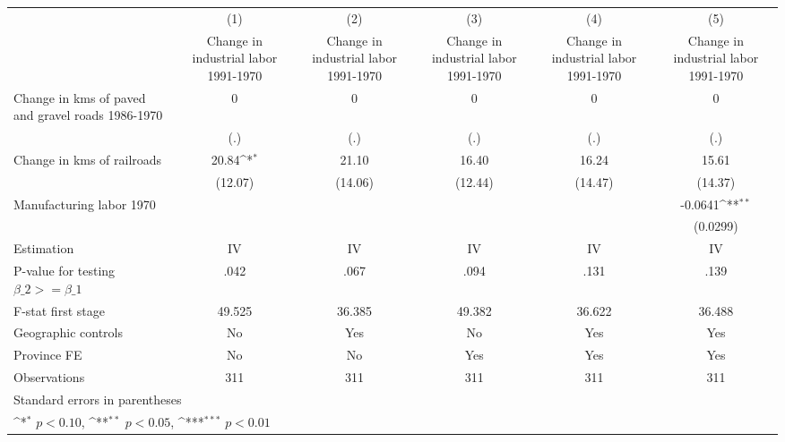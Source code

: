 {
\def\sym#1{\ifmmode^{#1}\else\(^{#1}\)\fi}
\begin{tabular}{l*{5}{c}}
\hline\hline
                    &\multicolumn{1}{c}{(1)}&\multicolumn{1}{c}{(2)}&\multicolumn{1}{c}{(3)}&\multicolumn{1}{c}{(4)}&\multicolumn{1}{c}{(5)}\\
                    &\multicolumn{1}{c}{Change in industrial labor 1991-1970}&\multicolumn{1}{c}{Change in industrial labor 1991-1970}&\multicolumn{1}{c}{Change in industrial labor 1991-1970}&\multicolumn{1}{c}{Change in industrial labor 1991-1970}&\multicolumn{1}{c}{Change in industrial labor 1991-1970}\\
\hline
Change in kms of paved and gravel roads 1986-1970&           0         &           0         &           0         &           0         &           0         \\
                    &         (.)         &         (.)         &         (.)         &         (.)         &         (.)         \\
[1em]
Change in kms of railroads&       20.84\sym{*}  &       21.10         &       16.40         &       16.24         &       15.61         \\
                    &     (12.07)         &     (14.06)         &     (12.44)         &     (14.47)         &     (14.37)         \\
[1em]
Manufacturing labor 1970&                     &                     &                     &                     &     -0.0641\sym{**} \\
                    &                     &                     &                     &                     &    (0.0299)         \\
\hline
Estimation          &          IV         &          IV         &          IV         &          IV         &          IV         \\
P-value for testing $\beta\_2 >= \beta\_1$&        .042         &        .067         &        .094         &        .131         &        .139         \\
F-stat first stage  &      49.525         &      36.385         &      49.382         &      36.622         &      36.488         \\
Geographic controls &          No         &         Yes         &          No         &         Yes         &         Yes         \\
Province FE         &          No         &          No         &         Yes         &         Yes         &         Yes         \\
Observations        &         311         &         311         &         311         &         311         &         311         \\
\hline\hline
\multicolumn{6}{l}{\footnotesize Standard errors in parentheses}\\
\multicolumn{6}{l}{\footnotesize \sym{*} \(p<0.10\), \sym{**} \(p<0.05\), \sym{***} \(p<0.01\)}\\
\end{tabular}
}
